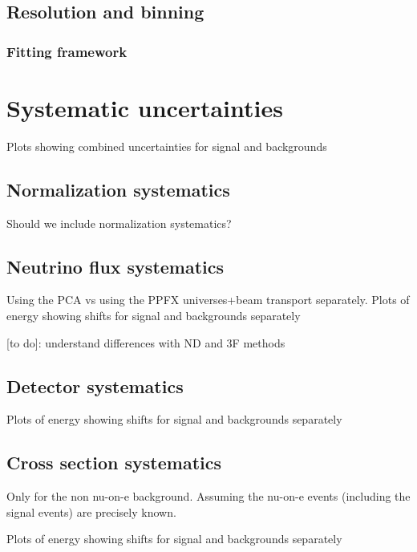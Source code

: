 \documentclass[12pt]{article}
\begin{document}
\subsection{Resolution and binning}
\subsubsection{Fitting framework}

\section{Systematic uncertainties}
Plots showing combined uncertainties for signal and backgrounds

\subsection{Normalization systematics}
Should we include normalization systematics?

\subsection{Neutrino flux systematics}
Using the PCA vs using the PPFX universes+beam transport separately. Plots of energy showing shifts for signal and backgrounds separately

[to do]: understand differences with ND and 3F methods

\subsection{Detector systematics}
Plots of energy showing shifts for signal and backgrounds separately
\subsection{Cross section systematics}
Only for the non nu-on-e background. Assuming the nu-on-e events (including the signal events) are precisely known.

Plots of energy showing shifts for signal and backgrounds separately

\end{document}
